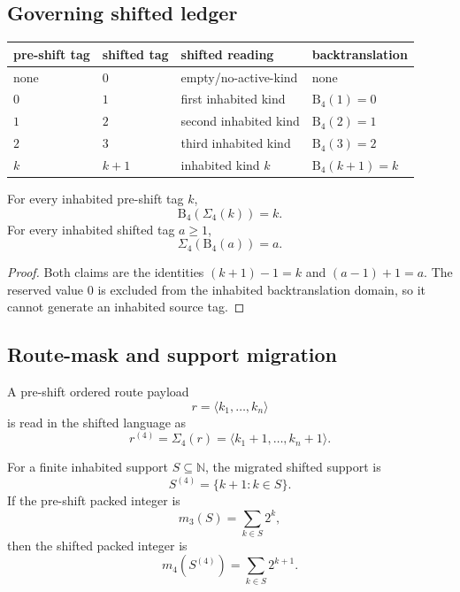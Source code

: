 \subsection{Governing shifted ledger}
\label{subsec:v400-r01-governing-shifted-ledger}

\begin{center}
\small
\begin{tabular}{@{}llll@{}}
\toprule
pre-shift tag & shifted tag & shifted reading & backtranslation\\
\midrule
none & $0$ & empty/no-active-kind & none\\
$0$ & $1$ & first inhabited kind & $\mathrm B_4(1)=0$\\
$1$ & $2$ & second inhabited kind & $\mathrm B_4(2)=1$\\
$2$ & $3$ & third inhabited kind & $\mathrm B_4(3)=2$\\
$k$ & $k+1$ & inhabited kind $k$ & $\mathrm B_4(k+1)=k$\\
\bottomrule
\end{tabular}
\end{center}

\begin{lemma}
\label{lem:v400-r01-shifted-inhabited-round-trip}
For every inhabited pre-shift tag $k$,
\[
 \mathrm B_4(\Sigma_4(k))=k.
\]
For every inhabited shifted tag $a\geq 1$,
\[
 \Sigma_4(\mathrm B_4(a))=a.
\]
\end{lemma}

\begin{proof}
Both claims are the identities $(k+1)-1=k$ and $(a-1)+1=a$. The reserved
value $0$ is excluded from the inhabited backtranslation domain, so it cannot
generate an inhabited source tag.
\end{proof}

\subsection{Route-mask and support migration}
\label{subsec:v400-r01-route-mask-support-migration}

\begin{definition}
\label{def:v400-r01-shifted-route-payload}
A pre-shift ordered route payload
\[
 r=\langle k_1,\ldots,k_n\rangle
\]
is read in the shifted language as
\[
 r^{(4)}=\Sigma_4(r)=\langle k_1+1,\ldots,k_n+1\rangle.
\]
\end{definition}

\begin{definition}
\label{def:v400-r01-shifted-support-and-packed-mask}
For a finite inhabited support $S\subseteq\mathbb N$, the migrated shifted support is
\[
 S^{(4)}=\{k+1:k\in S\}.
\]
If the pre-shift packed integer is
\[
 m_3(S)=\sum_{k\in S}2^k,
\]
then the shifted packed integer is
\[
 m_4(S^{(4)})=\sum_{k\in S}2^{k+1}.
\]
\end{definition}

